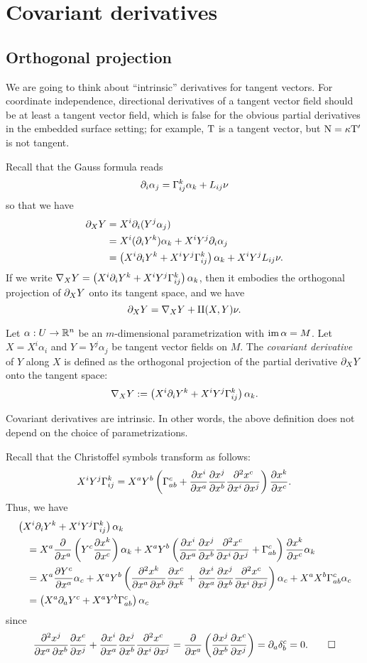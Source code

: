 \documentclass{../note}
\def\a{\alpha}
\def\II{\mathrm{II}}
\begin{document}
\chapter{Covariant derivatives}

\section{Orthogonal projection}
We are going to think about ``intrinsic'' derivatives for tangent vectors.
For coordinate independence, directional derivatives of a tangent vector field should be at least a tangent vector field, which is false for the obvious partial derivatives in the embedded surface setting; for example, $\mathrm{T}$ is a tangent vector, but $\mathrm{N}=\kappa\mathrm{T}'$ is not tangent.

Recall that the Gauss formula reads
\[\pd_i\a_j=\Gamma_{ij}^k\a_k+L_{ij}\nu\]
so that we have
\begin{align*}
\pd_XY
&=X^i\pd_i(Y^j\a_j)\\
&=X^i(\pd_iY^k)\a_k+X^iY^j\pd_i\a_j\\
&=\left(X^i\pd_iY^k+X^iY^j\Gamma_{ij}^k\right)\a_k+X^iY^jL_{ij}\nu.
\end{align*}
If we write $\nabla_XY=\left(X^i\pd_iY^k+X^iY^j\Gamma_{ij}^k\right)\a_k$, then it embodies the orthogonal projection of $\pd_XY$ onto its tangent space, and we have
\[\pd_XY=\nabla_XY+\II(X,Y)\nu.\]

\begin{defn}
Let $\a:U\to\R^n$ be an $m$-dimensional parametrization with $\im\a=M$.
Let $X=X^i\a_i$ and $Y=Y^j\a_j$ be tangent vector fields on $M$.
The \emph{covariant derivative} of $Y$ along $X$ is defined as the orthogonal projection of the partial derivative $\pd_XY$ onto the tangent space:
\[\nabla_XY:=\left(X^i\pd_iY^k+X^iY^j\Gamma_{ij}^k\right)\a_k.\]
\end{defn}

\begin{prop}
Covariant derivatives are intrinsic.
In other words, the above definition does not depend on the choice of parametrizations.
\end{prop}
\begin{pf}
Recall that the Christoffel symbols transform as follows:
\[X^iY^j\Gamma_{ij}^k=X^aY^b\left(\Gamma_{ab}^c+\pd{x^i}{x^a}\pd{x^j}{x^b}\pd[2]{x^c}{x^i}{x^j}\right)\pd{x^k}{x^c}.\]
Thus, we have
\begin{align*}
&\left(X^i\pd_iY^k+X^iY^j\Gamma_{ij}^k\right)\a_k\\
&\quad=X^a\pd{x^a}\left(Y^c\pd{x^k}{x^c}\right)\a_k+X^aY^b\left(\pd{x^i}{x^a}\pd{x^j}{x^b}\pd[2]{x^c}{x^i}{x^j}+\Gamma_{ab}^c\right)\pd{x^k}{x^c}\a_k\\
&\quad=X^a\pd{Y^c}{x^a}\a_c+X^aY^b\left(\pd[2]{x^k}{x^a}{x^b}\pd{x^c}{x^k}+\pd{x^i}{x^a}\pd{x^j}{x^b}\pd[2]{x^c}{x^i}{x^j}\right)\a_c+X^aX^b\Gamma_{ab}^c\a_c\\
&\quad=\left(X^a\pd_aY^c+X^aY^b\Gamma_{ab}^c\right)\a_c
\end{align*}
since
\[\pd[2]{x^j}{x^a}{x^b}\pd{x^c}{x^j}+\pd{x^i}{x^a}\pd{x^j}{x^b}\pd[2]{x^c}{x^i}{x^j}=\pd{x^a}\left(\pd{x^j}{x^b}\pd{x^c}{x^j}\right)=\pd_a\delta_b^c=0.\qedhere\]
\end{pf}
\end{document}
